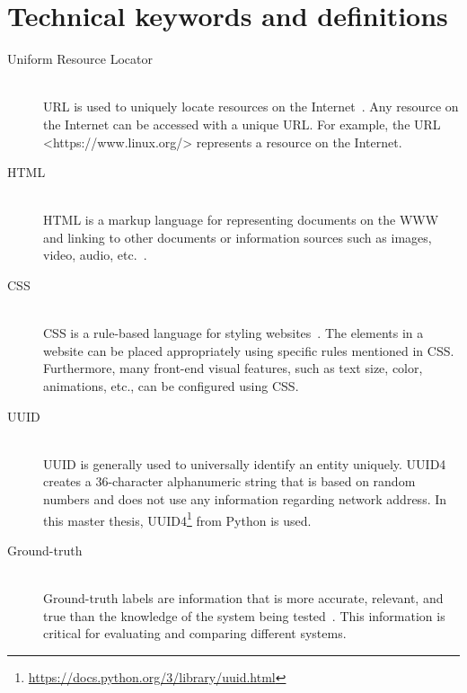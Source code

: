 \appendix
\chapter{Technical keywords and definitions}
\label{appendix:A}
\begin{description}
	
	\item[Uniform Resource Locator] \hfill \\
	
	 \ac{URL} is used to uniquely locate resources on the Internet~\cite{berners1994uniform}. Any resource on the Internet can be accessed with a unique \ac{URL}. For example, the \ac{URL} <https://www.linux.org/> represents a resource on the Internet.
	
	 \item[HTML] \hfill \\
	 
	 \ac{HTML} is a markup language for representing documents on the \ac{WWW} and linking to other documents or information sources such as images, video, audio, etc.~\cite{html}.
	
	 \item[CSS] \hfill \\ 
	 
	 \ac{CSS} is a rule-based language for styling websites~\cite{mozillaWhatCSS}. The elements in a website can be placed appropriately using specific rules mentioned in \ac{CSS}. Furthermore, many front-end visual features, such as text size, color, animations, etc., can be configured using \ac{CSS}.
	
	\item[UUID] \hfill \\ 	
	
	\ac{UUID} is generally used to universally identify an entity uniquely. UUID4 creates a 36-character alphanumeric string that is based on random numbers and does not use any information regarding network address. In this master thesis, UUID4\footnote{\url{https://docs.python.org/3/library/uuid.html}} from Python is used.
	
	\item[Ground-truth] \hfill \\
	
	Ground-truth labels are information that is more accurate, relevant, and true than the knowledge of the system being tested~\cite{cardoso2014gold}. This information is critical for evaluating and comparing different systems.
	

\end{description}
